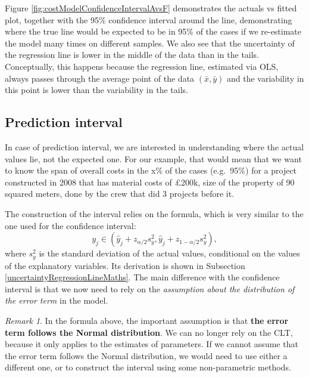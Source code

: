 \documentclass[
]{book}
\theoremstyle{definition}
\theoremstyle{definition}
\theoremstyle{definition}
\theoremstyle{definition}
\theoremstyle{remark}
\newtheorem*{remark}{Remark}
\begin{document}
Figure \ref{fig:costModelConfidenceIntervalAvsF} demonstrates the actuals vs fitted plot, together with the 95\% confidence interval around the line, demonstrating where the true line would be expected to be in 95\% of the cases if we re-estimate the model many times on different samples. We also see that the uncertainty of the regression line is lower in the middle of the data than in the tails. Conceptually, this happens because the regression line, estimated via OLS, always passes through the average point of the data \((\bar{x},\bar{y})\) and the variability in this point is lower than the variability in the tails.

\subsection{Prediction interval}\label{uncertaintyRegressionLinePrediction}

In case of prediction interval, we are interested in understanding where the actual values lie, not the expected one. For our example, that would mean that we want to know the span of overall costs in the x\% of the cases (e.g.~95\%) for a project constructed in 2008 that has material costs of £200k, size of the property of 90 squared meters, done by the crew that did 3 projects before it.

The construction of the interval relies on the formula, which is very similar to the one used for the confidence interval:
\begin{equation}
y_j \in (\hat{y}_j + z_{\alpha/2} s_y^2, \hat{y}_j + z_{1-\alpha/2} s_y^2),
\label{eq:predictionIntervalRegression}
\end{equation}
where \(s_y^2\) is the standard deviation of the actual values, conditional on the values of the explanatory variables. Its derivation is shown in Subsection \ref{uncertaintyRegressionLineMaths}. The main difference with the confidence interval is that we now need to rely on the \emph{assumption about the distribution of the error term} in the model.

\begin{remark}
In the formula above, the important assumption is that \textbf{the error term follows the Normal distribution}. We can no longer rely on the CLT, because it only applies to the estimates of parameters. If we cannot assume that the error term follows the Normal distribution, we would need to use either a different one, or to construct the interval using some non-parametric methods.
\end{remark}
\end{document}
